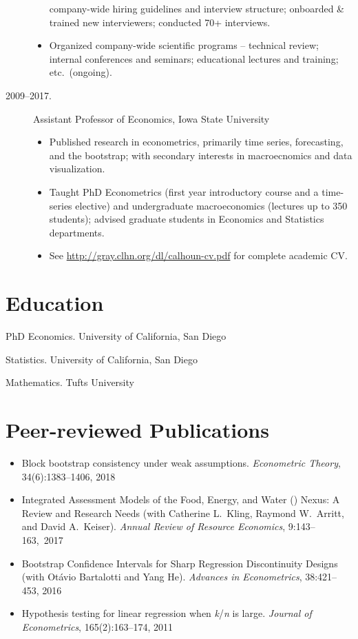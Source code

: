 \documentclass[10pt]{safecv}%
\begin{document}
\begin{description}
\begin{itemize}
    company-wide hiring guidelines and interview structure; onboarded
    \& trained new interviewers; conducted 70+ interviews.
  \item Organized company-wide scientific programs -- technical
    review; internal conferences and seminars; educational lectures
    and training; etc.\ (ongoing).
  \end{itemize}
\item[2009--2017.] Assistant Professor of Economics, Iowa State University
  \begin{itemize}
  \item Published research in econometrics, primarily time
    series, forecasting, and the bootstrap; with secondary interests
    in macroecnomics and data visualization.
   \item Taught PhD Econometrics (first year introductory course and
     a time-series elective) and undergraduate macroeconomics (lectures up to 350 students); advised
     graduate students in Economics and Statistics departments.
   \item See \url{http://gray.clhn.org/dl/calhoun-cv.pdf} for complete
     academic CV.
   \end{itemize}
\end{description}

\section*{Education}

\begin{description}[noitemsep]
\item[2009.] PhD Economics. University of California, San Diego
\item[2006.]  Statistics. University of California, San Diego
\item[2001.]  Mathematics. Tufts University
\end{description}

\section*{Peer-reviewed Publications}

\begin{itemize}[noitemsep]
\item Block bootstrap consistency under weak assumptions.
  \textit{Econometric Theory}, 34(6):1383--1406, 2018
\item Integrated Assessment Models of the Food, Energy, and Water
  () Nexus: A Review and Research Needs (with Catherine
  L.\ Kling, Raymond W.\ Arritt, and David A.\ Keiser). \textit{Annual
    Review of Resource Economics}, \mbox{9:143--163, 2017}
\item Bootstrap Confidence Intervals for Sharp Regression
  Discontinuity Designs (with Ot\'avio Bartalotti and Yang
  He). \textit{Advances in Econometrics}, 38:421--453, 2016
\item Hypothesis testing for linear regression when
  \textit{k}/\textit{n} is large. \textit{Journal of Econometrics},
  165(2):163--174, 2011
\end{itemize}
\end{document}
